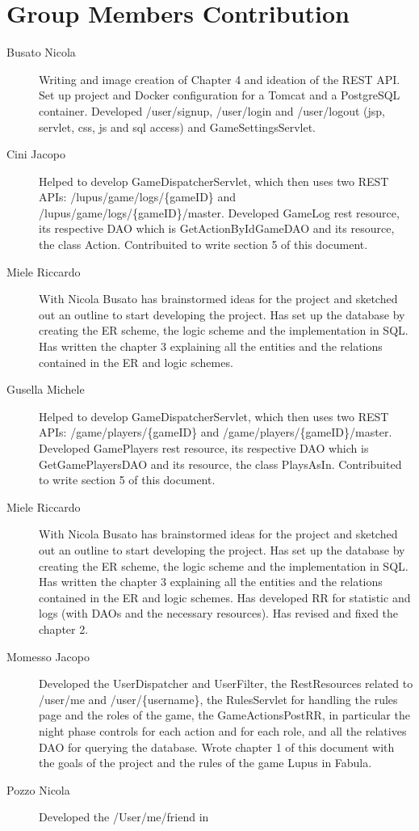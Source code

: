 \section{Group Members Contribution}


\begin{description}
	\item[Busato Nicola] Writing and image creation of Chapter 4 and ideation of the REST API. Set up project and Docker configuration for a Tomcat and a PostgreSQL container. Developed /user/signup, /user/login and /user/logout (jsp, servlet, css, js and sql access) and GameSettingsServlet.
    \item[Cini Jacopo]
    Helped to develop GameDispatcherServlet, which then uses two REST APIs: /lupus/game/logs/\{gameID\} and /lupus/game/logs/\{gameID\}/master. Developed GameLog rest resource, its respective DAO which is GetActionByIdGameDAO and its resource, the class Action. Contribuited to write section 5 of this document.
    \item[Miele Riccardo] With Nicola Busato has brainstormed ideas for the project and sketched out an outline to start developing the project. Has set up the database by creating the ER scheme, the logic scheme and the implementation in SQL. Has written the chapter 3 explaining all the entities and the relations contained in the ER and logic schemes.
    \item[Gusella Michele] Helped to develop GameDispatcherServlet, which then uses two REST APIs: /game/players/\{gameID\} and /game/players/\{gameID\}/master. Developed GamePlayers rest resource, its respective DAO which is GetGamePlayersDAO and its resource, the class PlaysAsIn. Contribuited to write section 5 of this document.
    \item[Miele Riccardo] With Nicola Busato has brainstormed ideas for the project and sketched out an outline to start developing the project. Has set up the database by creating the ER scheme, the logic scheme and the implementation in SQL. Has written the chapter 3 explaining all the entities and the relations contained in the ER and logic schemes.
    Has developed RR for statistic and logs (with DAOs and the necessary resources). Has revised and fixed the chapter 2.
	\item[Momesso Jacopo] Developed the UserDispatcher and UserFilter, the RestResources related to /user/me and /user/\{username\}, the RulesServlet for handling the rules page and the roles of the game, the GameActionsPostRR, in particular the night phase controls for each action and for each role, and all the relatives DAO for querying the database. Wrote chapter 1 of this document with the goals of the project and the rules of the game Lupus in Fabula.
    \item[Pozzo Nicola] Developed the /User/me/friend in
\end{description}
